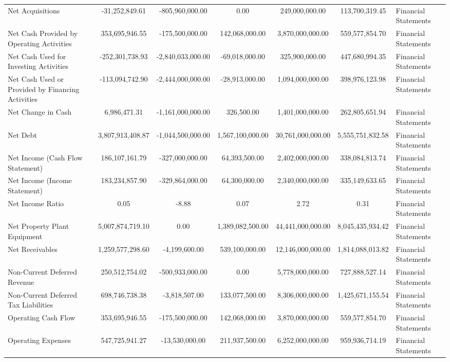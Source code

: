\begin{tabular}{lccccc}
Net Acquisitions & -31,252,849.61 & -805,960,000.00 & 0.00 & 249,000,000.00 & 113,700,319.45 & Financial Statements \\
Net Cash Provided by Operating Activities & 353,695,946.55 & -175,500,000.00 & 142,068,000.00 & 3,870,000,000.00 & 559,577,854.70 & Financial Statements \\
Net Cash Used for Investing Activities & -252,301,738.93 & -2,840,033,000.00 & -69,018,000.00 & 325,900,000.00 & 447,680,994.35 & Financial Statements \\
Net Cash Used or Provided by Financing Activities & -113,094,742.90 & -2,444,000,000.00 & -28,913,000.00 & 1,094,000,000.00 & 398,976,123.98 & Financial Statements \\
Net Change in Cash & 6,986,471.31 & -1,161,000,000.00 & 326,500.00 & 1,401,000,000.00 & 262,805,651.94 & Financial Statements \\
Net Debt & 3,807,913,408.87 & -1,044,500,000.00 & 1,567,100,000.00 & 30,761,000,000.00 & 5,555,751,832.58 & Financial Statements \\
Net Income (Cash Flow Statement) & 186,107,161.79 & -327,000,000.00 & 64,393,500.00 & 2,402,000,000.00 & 338,084,813.74 & Financial Statements \\
Net Income (Income Statement) & 183,234,857.90 & -329,864,000.00 & 64,300,000.00 & 2,340,000,000.00 & 335,149,633.65 & Financial Statements \\
Net Income Ratio & 0.05 & -8.88 & 0.07 & 2.72 & 0.31 & Financial Statements \\
Net Property Plant Equipment & 5,007,874,719.10 & 0.00 & 1,389,082,500.00 & 44,441,000,000.00 & 8,045,435,934.42 & Financial Statements \\
Net Receivables & 1,259,577,298.60 & -4,199,600.00 & 539,100,000.00 & 12,146,000,000.00 & 1,814,088,013.82 & Financial Statements \\
Non-Current Deferred Revenue & 250,512,754.02 & -500,933,000.00 & 0.00 & 5,778,000,000.00 & 727,888,527.14 & Financial Statements \\
Non-Current Deferred Tax Liabilities & 698,746,738.38 & -3,818,507.00 & 133,077,500.00 & 8,306,000,000.00 & 1,425,671,155.54 & Financial Statements \\
Operating Cash Flow & 353,695,946.55 & -175,500,000.00 & 142,068,000.00 & 3,870,000,000.00 & 559,577,854.70 & Financial Statements \\
Operating Expenses & 547,725,941.27 & -13,530,000.00 & 211,937,500.00 & 6,252,000,000.00 & 959,936,714.19 & Financial Statements \\

\end{tabular}
